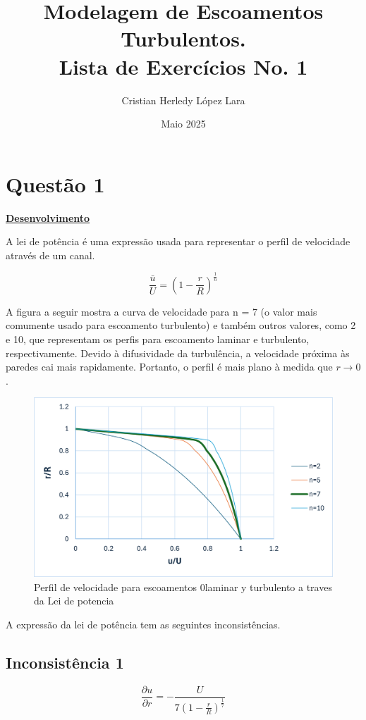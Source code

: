 \documentclass[12pt]{article}
\title{\textbf{Modelagem de Escoamentos Turbulentos. \\Lista de Exercícios No. 1}}
\author{Cristian Herledy López Lara}
\date{Maio 2025}
\begin{document}
	
\maketitle


\section*{Questão 1}

\textbf{\underline{Desenvolvimento}}

A lei de potência é uma expressão usada para representar o perfil de velocidade através de um canal. 

\begin{equation}
	\frac{\bar{u}}{U}  =  (1-\frac{r}{R})  ^\frac{1}{n}
\end{equation}

A figura a seguir mostra a curva de velocidade para n = 7 (o valor mais comumente usado para escoamento turbulento) e também outros valores, como 2 e 10, que representam os perfis para escoamento laminar e turbulento, respectivamente. Devido à difusividade da turbulência, a velocidade próxima às paredes cai mais rapidamente. Portanto, o perfil é mais plano à medida que $r \rightarrow  0$.

\begin{figure}[H]
	\centering
	\includegraphics[width=.65\textwidth]{figures/1}
	\caption{Perfil de velocidade para escoamentos  0laminar y turbulento a traves da Lei de potencia}
\end{figure}

A expressão da lei de potência tem as seguintes inconsistências.

\subsection*{Inconsistência 1}

\begin{equation}
	\frac{\partial u}{\partial r}  =  -\frac{U}   {7(1-\frac{r}{R})  ^\frac{1}{7}}
\end{equation}
\end{document}
